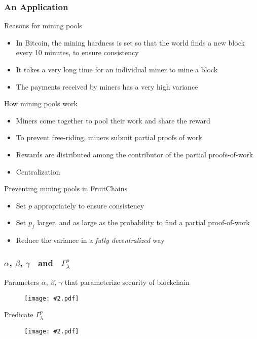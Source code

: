 \documentclass{beamer}
\newcommand{\insfig}[2][1]{
	\begin{figure}
		\texttt{[image: \#2.pdf]}
	\end{figure}
}
\newcommand{\insblk}[2]{
	\begin{block}{#1}
		\insfig{#2}
	\end{block}
}
\begin{document}
\begin{spacing}{1.2}
\begin{frame}
	\frametitle{An Application}
	\vspace{-5pt}
	\begin{block}{Reasons for mining pools}
		\begin{itemize}
			\item In Bitcoin, the mining hardness is set so that the world finds a new block every 10 minutes, to ensure consistency
			\item It takes a very long time for an individual miner to mine a block
			\item The payments received by miners has a very high variance
		\end{itemize}
	\end{block}
	\vspace{-3pt}
	\begin{block}{How mining pools work}
		\begin{itemize}
			\item Miners come together to pool their work and share the reward
			\item To prevent free-riding, miners submit partial proofs of work
			\item Rewards are distributed among the contributor of the partial proofs-of-work
			\item Centralization
		\end{itemize}
	\end{block}
	\vspace{-3pt}
	\begin{block}{Preventing mining pools in FruitChains}
		\begin{itemize}
			\item Set $p$ appropriately to ensure consistency
			\item Set $p_f$ larger, and as large as the probability to find a partial proof-of-work
			\item Reduce the variance in a \textit{fully decentralized} way
		\end{itemize}
	\end{block}
\end{frame}

\begin{frame}
\end{frame}


\begin{frame}
	\frametitle{$\alpha$, $\beta$, $\gamma$ \ and \ $\Gamma_\lambda^p$}
	\insblk{Parameters $\alpha$, $\beta$, $\gamma$ that parameterize security of blockchain}{Para1}
	\vspace{20pt}
	\insblk{Predicate $\Gamma_\lambda^p$}{Para2}
\end{frame}


\end{spacing}
\end{document}
